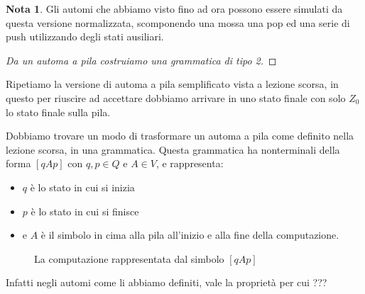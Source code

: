 \documentclass[12pt]{report}
\theoremstyle{definition}
\theoremstyle{regard}
\newtheorem{nota}{Nota}
\begin{document}
\begin{nota}
	Gli automi che abbiamo visto fino ad ora possono essere simulati da questa versione normalizzata, scomponendo una mossa una pop ed una serie di push utilizzando degli stati ausiliari.
\end{nota}

\begin{proof}[Da un automa a pila costruiamo una grammatica di tipo 2]
\end{proof}

Ripetiamo la versione di automa a pila semplificato vista a lezione scorsa, in questo per riuscire ad accettare dobbiamo arrivare in uno stato finale con solo $Z_0$ lo stato finale sulla pila.

Dobbiamo trovare un modo di trasformare un automa a pila come definito nella lezione scorsa, in una grammatica.
Questa grammatica ha nonterminali della forma $[qAp]$ con $q, p \in Q$ e $A \in V$, e rappresenta:
\begin{itemize}
	\item $q$ è lo stato in cui si inizia
	\item $p$ è lo stato in cui si finisce 
	\item e $A$ è il simbolo in cima alla pila all'inizio e alla fine della computazione.
\end{itemize}
\begin{figure}[H]
	\centering
	\caption{La computazione rappresentata dal simbolo $[qAp]$}
\end{figure}
Infatti negli automi come li abbiamo definiti, vale la proprietà per cui ??? %
\end{document}
